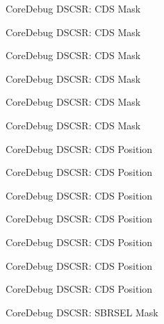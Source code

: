 \begin{DoxyRefList}
\label{deprecated__deprecated000148}%
%
Core\+Debug D\+S\+C\+SR\+: C\+DS Mask 

\label{deprecated__deprecated000224}%
%
Core\+Debug D\+S\+C\+SR\+: C\+DS Mask 

\label{deprecated__deprecated000287}%
%
Core\+Debug D\+S\+C\+SR\+: C\+DS Mask 

\label{deprecated__deprecated000366}%
%
Core\+Debug D\+S\+C\+SR\+: C\+DS Mask 

\label{deprecated__deprecated000442}%
%
Core\+Debug D\+S\+C\+SR\+: C\+DS Mask 

\label{deprecated__deprecated000545}%
%
Core\+Debug D\+S\+C\+SR\+: C\+DS Mask  
\item[Member \mbox{\hyperlink{group__CMSIS__CoreDebug_ga4be5d0f8af5d7d8ec04bde78ce18e10e}{Core\+Debug\+\_\+\+D\+S\+C\+S\+R\+\_\+\+C\+D\+S\+\_\+\+Pos}} ]\label{deprecated__deprecated000093}%
%
Core\+Debug D\+S\+C\+SR\+: C\+DS Position 

\label{deprecated__deprecated000147}%
%
Core\+Debug D\+S\+C\+SR\+: C\+DS Position 

\label{deprecated__deprecated000223}%
%
Core\+Debug D\+S\+C\+SR\+: C\+DS Position 

\label{deprecated__deprecated000286}%
%
Core\+Debug D\+S\+C\+SR\+: C\+DS Position 

\label{deprecated__deprecated000365}%
%
Core\+Debug D\+S\+C\+SR\+: C\+DS Position 

\label{deprecated__deprecated000441}%
%
Core\+Debug D\+S\+C\+SR\+: C\+DS Position 

\label{deprecated__deprecated000544}%
%
Core\+Debug D\+S\+C\+SR\+: C\+DS Position  
\item[Member \mbox{\hyperlink{group__CMSIS__CoreDebug_gaaffe28a24f05446e55ba3d75bb6f4cd0}{Core\+Debug\+\_\+\+D\+S\+C\+S\+R\+\_\+\+S\+B\+R\+S\+E\+L\+\_\+\+Msk}} ]\label{deprecated__deprecated000096}%
%
Core\+Debug D\+S\+C\+SR\+: S\+B\+R\+S\+EL Mask 


\end{DoxyRefList}
